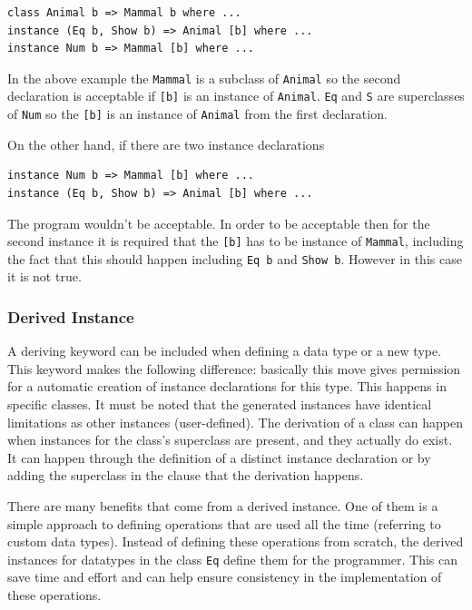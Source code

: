 \documentclass[a4paper, titlepage, twoside]{article}
\begin{document}
\begin{verbatim}
class Animal b => Mammal b where ...
instance (Eq b, Show b) => Animal [b] where ...
instance Num b => Mammal [b] where ...
\end{verbatim}

In the above example the \texttt{Mammal} is a subclass of \texttt{Animal} so the second declaration is acceptable if \texttt{[b]} is an instance of \texttt{Animal}. \texttt{Eq} and \texttt{S} are superclasses of \texttt{Num} so the \texttt{[b]} is an instance of \texttt{Animal} from the first declaration.

On the other hand, if there are two instance declarations

\begin{verbatim}
instance Num b => Mammal [b] where ...
instance (Eq b, Show b) => Animal [b] where ...
\end{verbatim}

The program wouldn't be acceptable. In order to be acceptable then for the second instance it is required that the \texttt{[b]} has to be instance of \texttt{Mammal}, including the fact that this should happen including \texttt{Eq b} and \texttt{Show b}. However in this case it is not true.

\subsubsection{Derived Instance}
\label{sec:org6fdf8f1}

A deriving keyword can be included when defining a data type or a new type. This keyword makes the following difference: basically this move gives permission for a automatic creation of instance declarations for this type. This happens in specific classes. It must be noted that the generated instances have identical limitations as other instances (user-defined). The derivation of a class can happen when instances for the class’s superclass are present, and they actually do exist. It can happen through the definition of a distinct instance declaration or by adding the superclass in the clause that the derivation happens.

There are many benefits that come from a derived instance. One of them is a simple approach to defining operations that are used all the time (referring to custom data types). Instead of defining these operations from scratch, the derived instances for datatypes in the class \texttt{Eq} define them for the programmer. This can save time and effort and can help ensure consistency in the implementation of these operations.
\end{document}
